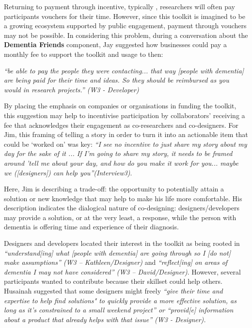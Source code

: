Returning to payment through incentive, typically , researchers will often pay participants vouchers for their time. However, since this toolkit is imagined to be a growing ecosystem supported by public engagement, payment through vouchers may not be possible. In considering this problem, during a conversation about the \textbf{Dementia Friends} component, Jay suggested how businesses could pay a monthly fee to support the toolkit and usage to then:

\textit{``be able to pay the people they were contacting... that way [people with dementia] are being paid for their time and ideas. So they should be reimbursed as you would in research projects.'' (W3 - Developer)}

By placing the emphasis on companies or organisations in funding the toolkit, this suggestion may help to incentivise participation by collaborators’ receiving a fee that acknowledges their engagement as co-researchers and co-designers. For Jim, this framing of telling a story in order to turn it into an actionable item that could be ‘worked on’ was key: 
\textit{ ``I see no incentive to just share my story about my day for the sake of it ... If I'm going to share my story, it needs to be framed around 'tell me about your day, and how do you make it work for you... maybe we ([designers]) can help you''(Interview3)}.
 
Here, Jim is describing a trade-off: the opportunity to potentially attain a solution or new knowledge that may help to make his life more comfortable. His description indicates the dialogical nature of co-designing: designers/developers may provide a solution, or at the very least, a response, while the person with dementia is offering time and experience of their diagnosis. 

Designers and developers located their interest in the toolkit as being rooted in \textit{``understand[ing] what [people with dementia] are going through so I [do not] make assumptions'' (W3 – Kathleen/Designer)} and \textit{``reflect[ing] on areas of dementia I may not have considered'' (W3 – David/Designer)}. However, several participants wanted to contribute because their skillset could help others. Husainah suggested that some designers might freely \textit{``give their time and expertise to help find solutions" to quickly provide a more effective solution, as long as it’s constrained to a small weekend project'' or ``provid[e] information about a product that already helps with that issue'' (W3 - Designer).}


